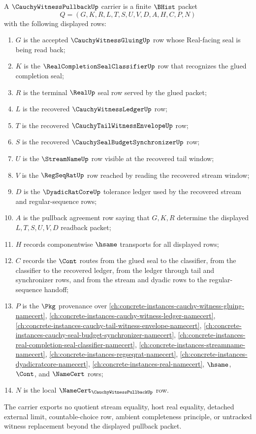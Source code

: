 \begin{definition}
\label{def:cauchy-witness-pullback-carrier}
A $\CauchyWitnessPullbackUp$ carrier is a finite $\BHist$ packet
$$
Q=(G,K,R,L,T,S,U,V,D,A,H,C,P,N)
$$
with the following displayed rows:
\begin{enumerate}
\item $G$ is the accepted $\CauchyWitnessGluingUp$ row whose Real-facing seal is being read back;
\item $K$ is the $\RealCompletionSealClassifierUp$ row that recognizes the glued completion seal;
\item $R$ is the terminal $\RealUp$ seal row served by the glued packet;
\item $L$ is the recovered $\CauchyWitnessLedgerUp$ row;
\item $T$ is the recovered $\CauchyTailWitnessEnvelopeUp$ row;
\item $S$ is the recovered $\CauchySealBudgetSynchronizerUp$ row;
\item $U$ is the $\StreamNameUp$ row visible at the recovered tail window;
\item $V$ is the $\RegSeqRatUp$ row reached by reading the recovered stream window;
\item $D$ is the $\DyadicRatCoreUp$ tolerance ledger used by the recovered stream and regular-sequence rows;
\item $A$ is the pullback agreement row saying that $G,K,R$ determine the displayed $L,T,S,U,V,D$ readback packet;
\item $H$ records componentwise $\hsame$ transports for all displayed rows;
\item $C$ records the $\Cont$ routes from the glued seal to the classifier, from the classifier to the recovered ledger, from the ledger through tail and synchronizer rows, and from the stream and dyadic rows to the regular-sequence handoff;
\item $P$ is the $\Pkg$ provenance over \autoref{ch:concrete-instances-cauchy-witness-gluing-namecert}, \autoref{ch:concrete-instances-cauchy-witness-ledger-namecert}, \autoref{ch:concrete-instances-cauchy-tail-witness-envelope-namecert}, \autoref{ch:concrete-instances-cauchy-seal-budget-synchronizer-namecert}, \autoref{ch:concrete-instances-real-completion-seal-classifier-namecert}, \autoref{ch:concrete-instances-streamname-namecert}, \autoref{ch:concrete-instances-regseqrat-namecert}, \autoref{ch:concrete-instances-dyadicratcore-namecert}, \autoref{ch:concrete-instances-real-namecert}, $\hsame$, $\Cont$, and $\NameCert$ rows;
\item $N$ is the local $\NameCert_{\CauchyWitnessPullbackUp}$ row.
\end{enumerate}
The carrier exports no quotient stream equality, host real equality, detached external limit, countable-choice row, ambient completeness principle, or untracked witness replacement beyond the displayed pullback packet.
\end{definition}


